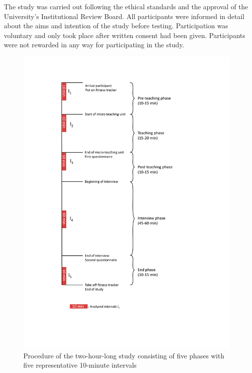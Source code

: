 \documentclass[preprint, 3p,
authoryear]{elsarticle} %
\begin{document}
The study was carried out following the ethical standards and the
approval of the University's Institutional Review Board. All
participants were informed in detail about the aims and intention of the
study before testing. Participation was voluntary and only took place
after written consent had been given. Participants were not rewarded in
any way for participating in the study.

\begin{figure}[htbp]
  \centering
  \includegraphics[width=1\textwidth]{images/Timeline.pdf}
  \caption{Procedure of the two-hour-long study consisting of five phases with five representative 10-minute intervals}
  \label{Procedure of the two-hour-long study consisting of five phases with five representative 10-minute intervals}
\end{figure}
\end{document}
